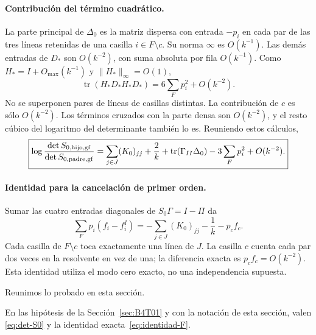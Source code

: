 \paragraph{Contribución del término cuadrático.}
La parte principal de $\Delta_0$ es la matriz dispersa con entrada $-p_i$
en cada par de las tres líneas retenidas de una casilla $i\in F\setminus c$.
Su norma $\infty$ es $O(k^{-1})$. Las demás entradas de $D_*$ son
$O(k^{-2})$, con suma absoluta por fila $O(k^{-1})$.
Como $H_*=I+O_{\max}(k^{-1})$ y $\|H_*\|_\infty=O(1)$,
\[
 \operatorname{tr}(H_*D_*H_*D_*)=6\sum_Fp_i^2+O(k^{-2}).
\]
No se superponen pares de líneas de casillas distintas. La contribución
de $c$ es sólo $O(k^{-2})$. Los términos cruzados con la parte densa son
$O(k^{-2})$, y el resto cúbico del logaritmo del determinante también lo es.
Reuniendo estos cálculos,
\begin{equation}\label{eq:det-S0}
 \boxed{\log\frac{\det S_{0,\rm hijo,gf}}{\det S_{0,\rm padre,gf}}
 =\sum_{j\in J}(K_0)_{jj}+\frac2k+
 \operatorname{tr}(\Gamma_{II}\Delta_0)-3\sum_Fp_i^2+O(k^{-2}).}
\end{equation}

\paragraph{Identidad para la cancelación de primer orden.}
Sumar las cuatro entradas diagonales de $S_0\Gamma=I-\Pi$ da
\begin{equation}\label{eq:identidad-F}
 \boxed{\sum_Fp_i(f_i-f_i^I)
 =-\sum_{j\in J}(K_0)_{jj}-\frac1k-p_cf_c.}
\end{equation}
Cada casilla de $F\setminus c$ toca exactamente una línea de $J$.
La casilla $c$ cuenta cada par dos veces en la resolvente en vez de una;
la diferencia exacta es $p_cf_c=O(k^{-2})$.
Esta identidad utiliza el modo cero exacto, no una independencia supuesta.

Reunimos lo probado en esta sección.
\begin{lemasub}\label{lem:modocero}
En las hipótesis de la Sección~\ref{sec:B4T01} y con la notación de esta sección, valen
\eqref{eq:det-S0} y la identidad exacta~\eqref{eq:identidad-F}.
\end{lemasub}
